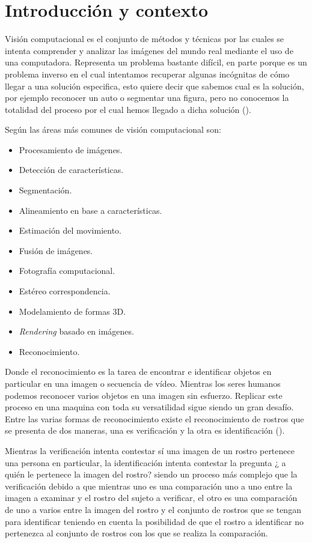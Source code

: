 \chapter{Introducción y contexto}\label{chap:Intro}

Visión computacional es el conjunto de métodos y técnicas por las cuales se intenta comprender y analizar las imágenes del mundo real mediante el uso de una computadora.
Representa un problema bastante difícil, en parte porque es un problema inverso en el cual intentamos recuperar algunas incógnitas de cómo llegar a una solución especifica, esto quiere decir que sabemos cual es la solución, por ejemplo reconocer un auto o segmentar una figura, pero no conocemos la totalidad del proceso por el cual hemos llegado a dicha solución (\cite{szeliski2010computer}). 

Según \cite{szeliski2010computer} las áreas más comunes de visión computacional son: 
\begin{itemize}
\item Procesamiento de imágenes.
\item Detección de características.
\item Segmentación.
\item Alineamiento en base a características.
\item Estimación del movimiento.
\item Fusión de imágenes.
\item Fotografía computacional.
\item Estéreo correspondencia.
\item Modelamiento de formas 3D.
\item \textit{Rendering} basado en imágenes.
\item Reconocimiento.
\end{itemize}

Donde el reconocimiento es la tarea de encontrar e identificar objetos en particular en una imagen o secuencia de vídeo. Mientras los seres humanos podemos reconocer varios objetos en una imagen sin esfuerzo. Replicar este proceso en una maquina con toda su versatilidad sigue siendo un gran desafío.
Entre las varias formas de reconocimiento existe el reconocimiento de rostros que se presenta de dos maneras, una es verificación y la otra es identificación (\cite{alice2003biometric}).

Mientras la verificación intenta contestar sí una imagen de un rostro pertenece una persona en particular, la identificación intenta contestar la pregunta ¿ a quién le pertenece la imagen del rostro? siendo un proceso más complejo que la verificación debido a que mientras uno es una comparación uno a uno entre la imagen a examinar y el rostro del sujeto a verificar, el otro es una comparación de uno a varios entre la imagen del rostro y el conjunto de rostros que se tengan para identificar teniendo en cuenta la posibilidad de que el rostro a identificar no pertenezca al conjunto de rostros con los que se realiza la comparación.

